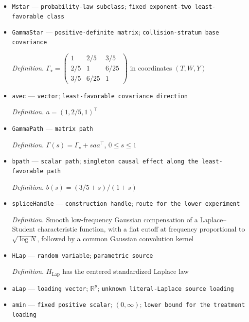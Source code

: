 \documentclass{article}
\begin{document}
\begin{itemize}
  \par\smallskip\noindent\emph{Definition.} \(\operatorname{ex}(A,B)=\sup_{a\in A}\inf_{b\in B}|a-b|\)
  \item \texttt{Mstar} --- \texttt{probability-\allowbreak{}law subclass}; \texttt{fixed exponent-\allowbreak{}two least-\allowbreak{}favorable class}
  \item \texttt{GammaStar} --- \texttt{positive-\allowbreak{}definite matrix}; \texttt{collision-\allowbreak{}stratum base covariance}
  \par\smallskip\noindent\emph{Definition.} \(\Gamma_\star=\begin{pmatrix}1&2/5&3/5\\2/5&1&6/25\\3/5&6/25&1\end{pmatrix}\) in coordinates \((T,W,Y)\)
  \item \texttt{avec} --- \texttt{vector}; \texttt{least-\allowbreak{}favorable covariance direction}
  \par\smallskip\noindent\emph{Definition.} \(a=(1,2/5,1)^\top\)
  \item \texttt{GammaPath} --- \texttt{matrix path}
  \par\smallskip\noindent\emph{Definition.} \(\Gamma(s)=\Gamma_\star+saa^\top\), \(0\le s\le1\)
  \item \texttt{bpath} --- \texttt{scalar path}; \texttt{singleton causal effect along the least-\allowbreak{}favorable path}
  \par\smallskip\noindent\emph{Definition.} \(b(s)=(3/5+s)/(1+s)\)
  \item \texttt{spliceHandle} --- \texttt{construction handle}; \texttt{route for the lower experiment}
  \par\smallskip\noindent\emph{Definition.} Smooth low-frequency Gaussian compensation of a Laplace--Student characteristic function, with a flat cutoff at frequency proportional to \(\sqrt{\log N}\), followed by a common Gaussian convolution kernel
  \item \texttt{HLap} --- \texttt{random variable}; \texttt{parametric source}
  \par\smallskip\noindent\emph{Definition.} \(H_{\mathrm{Lap}}\) has the centered standardized Laplace law
  \item \texttt{aLap} --- \texttt{loading vector}; \(\mathbb R^p\); \texttt{unknown literal-\allowbreak{}Laplace source loading}
  \item \texttt{amin} --- \texttt{fixed positive scalar}; \((0,\infty)\); \texttt{lower bound for the treatment loading}

\end{itemize}
\end{document}
